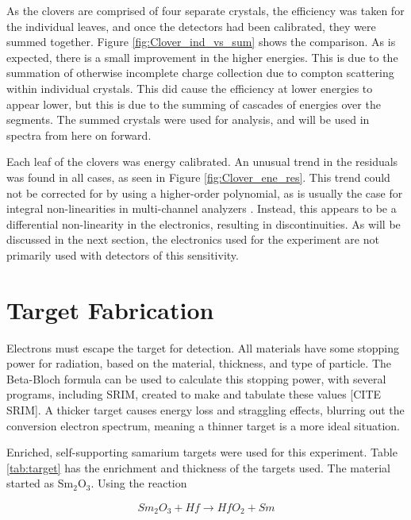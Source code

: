 

As the clovers are comprised of four separate crystals, the efficiency was taken for the individual leaves, and once the detectors had been calibrated, they were summed together. Figure \ref{fig:Clover_ind_vs_sum} shows the comparison. As is expected, there is a small improvement in the higher energies. This is due to the summation of otherwise incomplete charge collection due to compton scattering within individual crystals. This did cause the efficiency at lower energies to appear lower, but this is due to the summing of cascades of energies over the segments. The summed crystals were used for analysis, and will be used in spectra from here on forward.



Each leaf of the clovers was energy calibrated. An unusual trend in the residuals was found in all cases, as seen in Figure \ref{fig:Clover_ene_res}. This trend could not be corrected for by using a higher-order polynomial, as is usually the case for integral non-linearities in multi-channel analyzers \citep{knoll00:rad_det_meas}. Instead, this appears to be a differential non-linearity in the electronics, resulting in discontinuities. As will be discussed in the next section, the electronics used for the experiment are not primarily used with detectors of this sensitivity.



\section{Target Fabrication}

Electrons must escape the target for detection. All materials have some stopping power for radiation, based on the material, thickness, and type of particle. The Beta-Bloch formula can be used to calculate this stopping power, with several programs, including SRIM, created to make and tabulate these values [CITE SRIM]. A thicker target causes energy loss and straggling effects, blurring out the conversion electron spectrum, meaning a thinner target is a more ideal situation.

Enriched, self-supporting samarium targets were used for this experiment. Table \ref{tab:target} has the enrichment and thickness of the targets used. The material started as Sm$_2$O$_3$. Using the reaction

\begin{equation}
    Sm_2O_3 + Hf \xrightarrow{} HfO_2 + Sm
    \label{eq:sm_hf}
\end{equation}

